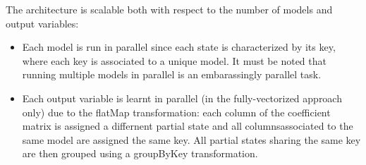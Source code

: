 The architecture is scalable both with respect to the number of models and
output variables:
\begin{itemize}
    \item Each model is run in parallel since each state is characterized by its key,
        where each key is associated to a unique model.
        It must be noted that running multiple models in parallel is an embarassingly
        parallel task.
    \item Each output variable is learnt in parallel (in the fully-vectorized approach only)
        due to the flatMap transformation: each column of the coefficient matrix is assigned a differnent
        partial state and all columnsassociated to the same model are assigned the same key.
        All partial states sharing the same key are then grouped using a groupByKey transformation.
\end{itemize}
